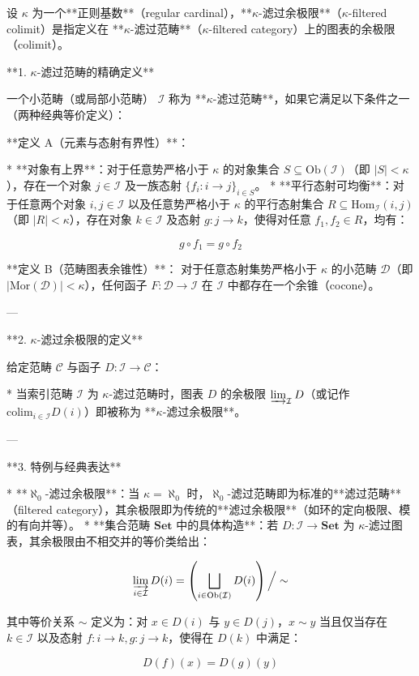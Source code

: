 \documentclass{ctexart}
\begin{document}
\begin{markdown}
设 $\kappa$ 为一个**正则基数**（regular cardinal），**$\kappa$-滤过余极限**（$\kappa$-filtered colimit）是指定义在 **$\kappa$-滤过范畴**（$\kappa$-filtered category）上的图表的余极限（colimit）。

**1. $\kappa$-滤过范畴的精确定义**

一个小范畴（或局部小范畴） $\mathcal{I}$ 称为 **$\kappa$-滤过范畴**，如果它满足以下条件之一（两种经典等价定义）：

**定义 A（元素与态射有界性）**：

* **对象有上界**：对于任意势严格小于 $\kappa$ 的对象集合 $S \subseteq \text{Ob}(\mathcal{I})$（即 $\vert{}S\vert{} < \kappa$），存在一个对象 $j \in \mathcal{I}$ 及一族态射 $\{f_i: i \to j\}_{i \in S}$。
* **平行态射可均衡**：对于任意两个对象 $i, j \in \mathcal{I}$ 以及任意势严格小于 $\kappa$ 的平行态射集合 $R \subseteq \text{Hom}_{\mathcal{I}}(i, j)$（即 $\vert{}R\vert{} < \kappa$），存在对象 $k \in \mathcal{I}$ 及态射 $g: j \to k$，使得对任意 $f_1, f_2 \in R$，均有：

$$g \circ f_1 = g \circ f_2$$



**定义 B（范畴图表余锥性）**：
对于任意态射集势严格小于 $\kappa$ 的小范畴 $\mathcal{D}$（即 $\vert{}\text{Mor}(\mathcal{D})\vert{} < \kappa$），任何函子 $F: \mathcal{D} \to \mathcal{I}$ 在 $\mathcal{I}$ 中都存在一个余锥（cocone）。

---

**2. $\kappa$-滤过余极限的定义**

给定范畴 $\mathcal{C}$ 与函子 $D: \mathcal{I} \to \mathcal{C}$：

* 当索引范畴 $\mathcal{I}$ 为 $\kappa$-滤过范畴时，图表 $D$ 的余极限 $\varinjlim_{\mathcal{I}} D$（或记作 $\text{colim}_{i \in \mathcal{I}} D(i)$）即被称为 **$\kappa$-滤过余极限**。

---

**3. 特例与经典表达**

* **$\aleph_0$-滤过余极限**：当 $\kappa = \aleph_0$ 时，$\aleph_0$-滤过范畴即为标准的**滤过范畴**（filtered category），其余极限即为传统的**滤过余极限**（如环的定向极限、模的有向并等）。
* **集合范畴 $\mathbf{Set}$ 中的具体构造**：若 $D: \mathcal{I} \to \mathbf{Set}$ 为 $\kappa$-滤过图表，其余极限由不相交并的等价类给出：

$$\varinjlim_{i \in \mathcal{I}} D(i) = \left( \bigsqcup_{i \in \text{Ob}(\mathcal{I})} D(i) \right) \Big/ \sim$$



其中等价关系 $\sim$ 定义为：对 $x \in D(i)$ 与 $y \in D(j)$，$x \sim y$ 当且仅当存在 $k \in \mathcal{I}$ 以及态射 $f: i \to k, g: j \to k$，使得在 $D(k)$ 中满足：

$$D(f)(x) = D(g)(y)$$
\end{markdown}
\end{document}
